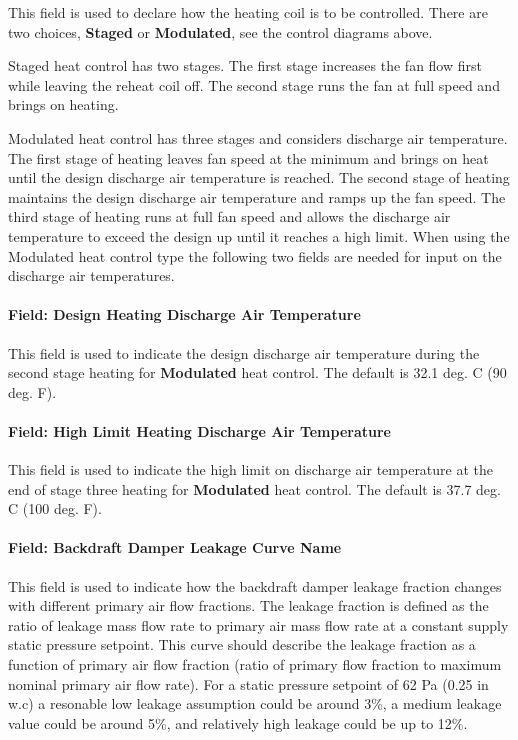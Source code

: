 This field is used to declare how the heating coil is to be controlled. There are two choices, \textbf{Staged} or \textbf{Modulated}, see the control diagrams above.

Staged heat control has two stages. The first stage increases the fan flow first while leaving the reheat coil off. The second stage runs the fan at full speed and brings on heating.

Modulated heat control has three stages and considers discharge air temperature. The first stage of heating leaves fan speed at the minimum and brings on heat until the design discharge air temperature is reached. The second stage of heating maintains the design discharge air temperature and ramps up the fan speed. The third stage of heating runs at full fan speed and allows the discharge air temperature to exceed the design up until it reaches a high limit. When using the Modulated heat control type the following two fields are needed for input on the discharge air temperatures.

\paragraph{Field: Design Heating Discharge Air Temperature}\label{field-heat-design-DAT-parallelPIU}

This field is used to indicate the design discharge air temperature during the second stage heating for \textbf{Modulated} heat control. The default is 32.1 deg. C (90 deg. F).

\paragraph{Field: High Limit Heating Discharge Air Temperature}\label{field-heat-limit-DAT-parallelPIU}

This field is used to indicate the high limit on discharge air temperature at the end of stage three heating for \textbf{Modulated} heat control.  The default is 37.7 deg. C (100 deg. F).

\paragraph{Field: Backdraft Damper Leakage Curve Name}\label{field-backdraft_damper_leakage_fraction_curve_name}

This field is used to indicate how the backdraft damper leakage fraction changes with different primary air flow fractions. The leakage fraction is defined as the ratio of leakage mass flow rate to primary air mass flow rate at a constant supply static pressure setpoint. This curve should describe the leakage fraction as a function of primary air flow fraction (ratio of primary flow fraction to maximum nominal primary air flow rate). For a static pressure setpoint of 62 Pa (0.25 in w.c) a resonable low leakage assumption could be around 3\%, a medium leakage value could be around 5\%, and relatively high leakage could be up to 12\%.

